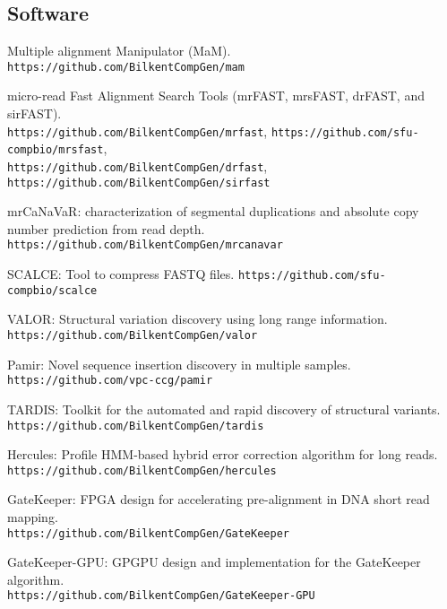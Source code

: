 \subsection{\small \sc Software}
\begin{list2}
\item
  Multiple alignment Manipulator (MaM).
  {\tt https://github.com/BilkentCompGen/mam}
\item
  micro-read Fast Alignment Search Tools (mrFAST, mrsFAST, drFAST, and sirFAST).\\
  {\tt https://github.com/BilkentCompGen/mrfast},
  {\tt https://github.com/sfu-compbio/mrsfast},\\
  {\tt https://github.com/BilkentCompGen/drfast},
  {\tt https://github.com/BilkentCompGen/sirfast}
\item
  mrCaNaVaR: characterization of segmental duplications and absolute copy number prediction from read depth.
  {\tt https://github.com/BilkentCompGen/mrcanavar}
\item
  SCALCE: Tool to compress FASTQ files. 
  {\tt https://github.com/sfu-compbio/scalce}
\clearpage
\item
  VALOR: Structural variation discovery using long range information. \\
  {\tt https://github.com/BilkentCompGen/valor}
\item
  Pamir: Novel sequence insertion discovery in multiple samples.
  {\tt https://github.com/vpc-ccg/pamir}
\item
  TARDIS: Toolkit for the automated and rapid discovery of structural variants.\\
  {\tt https://github.com/BilkentCompGen/tardis}
\item
  Hercules: Profile HMM-based hybrid error correction algorithm for long reads.\\
  {\tt https://github.com/BilkentCompGen/hercules}

\item
  GateKeeper: FPGA design for accelerating pre-alignment in DNA short read mapping.\\
  {\tt https://github.com/BilkentCompGen/GateKeeper}


  
  \item
  GateKeeper-GPU: GPGPU design and implementation for the GateKeeper algorithm.\\
  {\tt https://github.com/BilkentCompGen/GateKeeper-GPU}


\end{list2}
